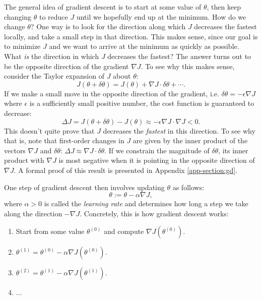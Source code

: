 \documentclass{article}
\theoremstyle{definition}
\begin{document}
The general idea of gradient descent is to start at some value of $\theta$, then keep changing $\theta$ to reduce $J$ until we hopefully end up at the minimum. How do we change $\theta$? One way is to look for the direction along which $J$ decreases the fastest locally, and take a small step in that direction. This makes sense, since our goal is to minimize $J$ and we want to arrive at the minimum as quickly as possible. What \textit{is} the direction in which $J$ decreases the fastest? The answer turns out to be the opposite direction of the gradient $\nabla J$. To see why this makes sense, consider the Taylor expansion of $J$ about $\theta$:
\begin{equation}
    J(\theta + \delta\theta) =  J(\theta) + \nabla J \cdot \delta\theta + \cdots.
\end{equation}
If we make a small move in the opposite direction of the gradient, i.e. $\delta\theta = -\epsilon \nabla J$ where $\epsilon$ is a sufficiently small positive number, the cost function is guaranteed to decrease:
\begin{equation}
   \Delta J = J(\theta + \delta\theta) -  J(\theta) \approx -\epsilon \nabla J \cdot \nabla J < 0.
\end{equation}
This doesn't quite prove that $J$ decreases the \textit{fastest} in this direction. To see why that is, note that first-order changes in $J$ are given by the inner product of the vectors $\nabla J$ and $\delta \theta$: $\Delta J \approx \nabla J \cdot \delta\theta$. If we constrain the magnitude of $\delta \theta$, its inner product with $\nabla J$ is most negative when it is pointing in the opposite direction of $\nabla J$. A formal proof of this result is presented in Appendix \ref{app-section:gd}.

One step of gradient descent then involves updating $\theta$ as follows:
\begin{equation}
    \theta := \theta - \alpha \nabla J,
\end{equation}
where $\alpha > 0$ is called the \textit{learning rate} and determines how long a step we take along the direction $-\nabla J$. Concretely, this is how gradient descent works:
\begin{enumerate}
    \item Start from some value $\theta^{(0)}$ and compute $\nabla J(\theta^{(0)})$.
    \item $\theta^{(1)}=\theta^{(0)}-\alpha\nabla J(\theta^{(0)})$.
    \item $\theta^{(2)}=\theta^{(1)}-\alpha\nabla J(\theta^{(1)})$.
    \item $\dots$
\end{enumerate}
\end{document}

